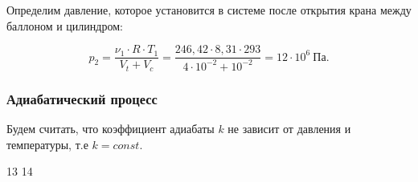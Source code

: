 \documentclass[a4paper,14pt]{article}
\theoremstyle{plain} %
\theoremstyle{definition} %
\theoremstyle{remark} %
\begin{document}
Определим давление, которое установится в системе после открытия крана между баллоном и цилиндром:

\begin{equation}
	p_2 = \frac{\nu_1 \cdot R \cdot T_1}{V_t + V_c} = \frac{246,42 \cdot 8,31 \cdot 293}{4 \cdot 10^{-2} + 10^{-2}} = 12 \cdot 10^6~\textrm{Па}.
\end{equation}

\subsubsection{Адиабатический процесс}

Будем считать, что коэффициент адиабаты $k$ не зависит от давления и температуры, т.е $k = const$. 

\newpage

13
14
\end{document}
